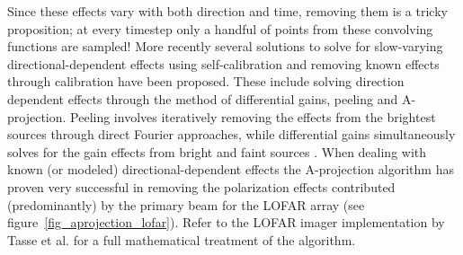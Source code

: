 Since these effects vary with both direction and time, removing them is a tricky proposition; at every timestep only a 
handful of points from these convolving functions are sampled! More recently several solutions to solve for slow-varying 
directional-dependent effects using self-calibration and removing known effects through calibration have been proposed. 
These include solving direction dependent effects through the method of differential gains, peeling and A-projection. Peeling 
involves iteratively removing the effects from the brightest sources through direct Fourier approaches, while differential 
gains simultaneously solves for the gain effects from bright and faint sources \cite{2011A&A...527A.107S,2011A&A...527A.108S}. 
When dealing with known (or modeled) directional-dependent effects the A-projection algorithm \cite{bhatnagar2008correcting} has 
proven very successful in removing the polarization effects contributed (predominantly) by the primary beam for the 
LOFAR array (see figure~\ref{fig_aprojection_lofar}). Refer to the LOFAR imager implementation by Tasse et 
al. \cite{tasse2013applying} for a full mathematical treatment of the algorithm.

